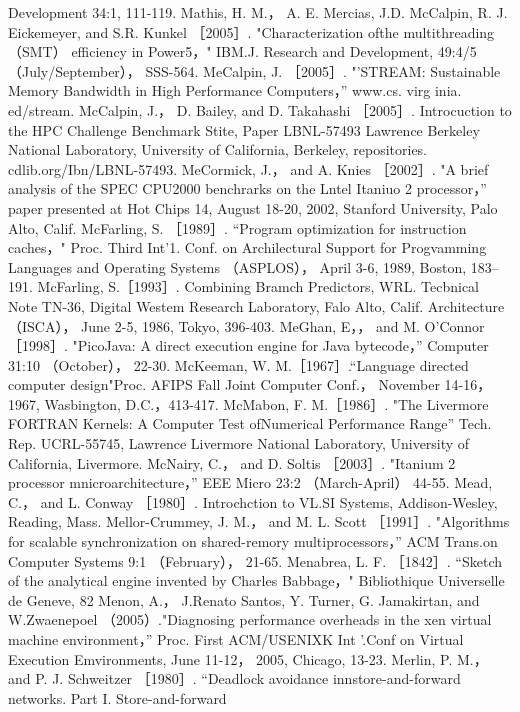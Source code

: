 Development 34:1, 111-119.
Mathis, H. M.， A. E. Mercias, J.D. McCalpin, R. J. Eickemeyer, and S.R. Kunkel ［2005］. "Characterization ofthe multithreading
（SMT） efficiency in Power5，" IBM.J. Research and Development, 49:4/5 （July/September）， SSS-564.
MeCalpin, J. ［2005］. "'STREAM: Sustainable Memory Bandwidth in High Performance Computers，” www.cs. virg inia. ed/stream.
McCalpin, J.， D. Bailey, and D. Takahashi ［2005］. Introcuction to the HPC Challenge Benchmark Stite, Paper LBNL-57493
Lawrence Berkeley National Laboratory, University of California, Berkeley, repositories. cdlib.org/Ibn/LBNL-57493.
MeCormick, J.， and A. Knies ［2002］. "A brief analysis of the SPEC CPU2000 benchrarks on the Lntel Itaniuo 2 processor，”
paper presented at Hot Chips 14, August 18-20, 2002, Stanford University, Palo Alto, Calif.
McFarling, S. ［1989］. “Program optimization for instruction caches，" Proc. Third Int'1. Conf. on Archilectural Support for
Progvamming Languages and Operating Systems （ASPLOS）， April 3-6, 1989, Boston, 183--191.
McFarling, S.［1993］. Combining Bramch Predictors, WRL. Tecbnical Note TN-36, Digital Westem Research Laboratory, Falo
Alto, Calif.
Architecture （ISCA）， June 2-5, 1986, Tokyo, 396-403.
MeGhan, E，， and M. O'Connor ［1998］. "PicoJava: A direct execution engine for Java bytecode，” Computer 31:10 （October）， 22-30.
McKeeman, W. M.［1967］.“Language directed computer design"Proc. AFIPS Fall Joint Computer Conf.， November 14-16，
1967, Wasbington, D.C.，413-417.
McMabon, F. M.［1986］. "The Livermore FORTRAN Kernels: A Computer Test ofNumerical Performance Range” Tech. Rep.
UCRL-55745, Lawrence Livermore National Laboratory, University of California, Livermore.
McNairy, C.， and D. Soltis ［2003］. "Itanium 2 processor mnicroarchitecture，” EEE Micro 23:2 （March-April） 44-55.
Mead, C.， and L. Conway ［1980］. Introchction to VL.SI Systems, Addison-Wesley, Reading, Mass.
Mellor-Crummey, J. M.， and M. L. Scott ［1991］. "Algorithms for scalable synchronization on shared-remory multiprocessors，”
ACM Trans.on Computer Systems 9:1 （February）， 21-65.
Menabrea, L. F. ［1842］. “Sketch of the analytical engine invented by Charles Babbage，" Bibliothique Universelle de Geneve, 82
Menon, A.， J.Renato Santos, Y. Turner, G. Jamakirtan, and W.Zwaenepoel （2005）."Diagnosing performance overheads in the
xen virtual machine environment，” Proc. First ACM/USENIXK Int '.Conf on Virtual Execution Emvironments, June 11-12，
2005, Chicago, 13-23.
Merlin, P. M.， and P. J. Schweitzer ［1980］. “Deadlock avoidance innstore-and-forward networks. Part I. Store-and-forward
